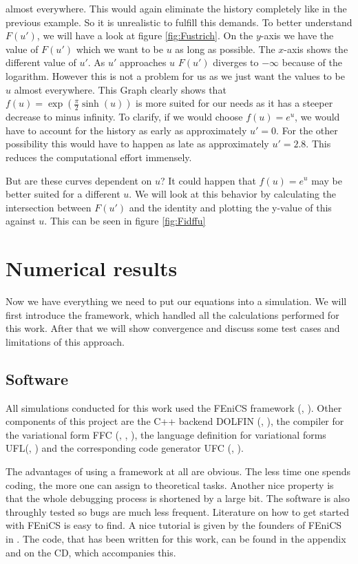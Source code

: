 \documentclass[12pt,a4paper,twoside, open=right]{scrreprt}
\theoremstyle{definition}
\theoremstyle{plain}
\begin{document}
almost everywhere. This would again eliminate the history completely like in the previous example. So it is unrealistic to fulfill this demands. To better understand $F(u')$, we will have a look at figure \ref{fig:Fustrich}. On the $y$-axis we have the value of $F(u')$ which we want to be $u$ as long as possible. The $x$-axis shows the different value of $u'$. As $u'$ approaches $u$ $F(u')$ diverges to $-\infty$ because of the logarithm. However this is not a problem for us as we just want the values to be $u$ almost everywhere. This Graph clearly shows that $f(u)=\exp(\frac{\pi}{2}\sinh(u))$ is more suited for our needs as it has a steeper decrease to minus infinity. To clarify, if we would choose $f(u)=e^u$, we would have to account for the history as early as approximately $u'=0$. For the other possibility this would have to happen as late as approximately $u'=2.8$. This reduces the computational effort immensely.
\par 
But are these curves dependent on $u$? It could happen that $f(u)=e^u$ may be better suited for a different $u$. We will look at this behavior by calculating the intersection between $F(u')$ and the identity and plotting the y-value of this against $u$. This can be seen in figure \ref{fig:Fidffu}
\chapter{Numerical results}
Now we have everything we need to put our equations into a simulation. We will first introduce the framework, which handled all the calculations performed for this work. After that we will show convergence and discuss some test cases and limitations of this approach.
\section{Software}
All simulations conducted for this work used the FEniCS framework (\cite{AlnaesBlechta2015a}, \cite{LoggMardalEtAl2012a}). Other components of this project are the C++ backend DOLFIN (\cite{LoggWells2010a}, \cite{LoggWellsEtAl2012a}), the compiler for the variational form FFC (\cite{KirbyLogg2006a}, \cite{LoggOlgaardEtAl2012a}, \cite{OlgaardWells2010b}), the language definition for variational forms UFL(\cite{AlnaesEtAl2012}, \cite{Alnaes2012a}) and the corresponding code generator UFC (\cite{AlnaesLoggEtAl2009a}, \cite{AlnaesLoggEtAl2012a}).
\par 
The advantages of using a framework at all are obvious. The less time one spends coding, the more one can assign to theoretical tasks. Another nice property is that the whole debugging process is shortened by a large bit. The software is also throughly tested so bugs are much less frequent. Literature on how to get started with FEniCS is easy to find. A nice tutorial is given by the founders of FEniCS in  \cite{Langtangen2017a}. The code, that has been written for this work, can be found in the appendix and on the CD, which accompanies this.
\end{document}
